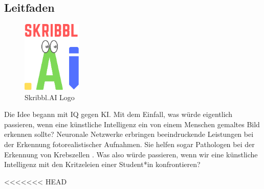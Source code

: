 \documentclass[11pt]{article}
\begin{document}
\subsection{Leitfaden}
\begin{figure}
\centering
\includegraphics[width=0.25\textwidth]{images/skribbl_logo.png}
\caption{\label{fig:skribblLogo}Skribbl.AI Logo}
\end{figure}
Die Idee begann mit IQ gegen KI. Mit dem Einfall, was würde eigentlich passieren, wenn eine künstliche Intelligenz ein von einem Menschen gemaltes Bild  erkennen sollte? Neuronale Netzwerke erbringen beeindruckende Leistungen bei der Erkennung fotorealistischer Aufnahmen. Sie helfen sogar Pathologen bei der Erkennung von Krebszellen \parencite{ElizabethDougherty2018}. Was also würde  passieren, wenn wir eine künstliche Intelligenz mit den Kritzeleien einer Student*in konfrontieren?

<<<<<<< HEAD

 
\end{document}
